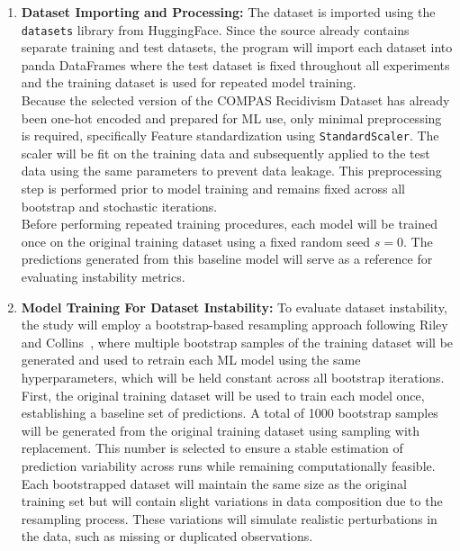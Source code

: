 \documentclass[12pt]{article}
\begin{document}
\begin{enumerate}
  \item \textbf{Dataset Importing and Processing:}
  The dataset is imported using the \texttt{datasets} library from HuggingFace. Since the source already contains separate training and test datasets, the program will import each dataset into panda DataFrames where the test dataset is fixed throughout all experiments and the training dataset is used for repeated model training.\\

  Because the selected version of the COMPAS Recidivism Dataset has already been one-hot encoded and prepared for ML use, only minimal preprocessing is required, specifically Feature standardization using \texttt{StandardScaler}. The scaler will be fit on the training data and subsequently applied to the test data using the same parameters to prevent data leakage. This preprocessing step is performed prior to model training and remains fixed across all bootstrap and stochastic iterations.\\

  Before performing repeated training procedures, each model will be trained once on the original training dataset using a fixed random seed $s = 0$. The predictions generated from this baseline model will serve as a reference for evaluating instability metrics.

  \item \textbf{Model Training For Dataset Instability:}
  To evaluate dataset instability, the study will employ a bootstrap-based resampling approach following Riley and Collins~\cite{riley2023stability}, where multiple bootstrap samples of the training dataset will be generated and used to retrain each ML model using the same hyperparameters, which will be held constant across all bootstrap iterations.\\

  First, the original training dataset will be used to train each model once, establishing a baseline set of predictions. A total of 1000 bootstrap samples will be generated from the original training dataset using sampling with replacement. This number is selected to ensure a stable estimation of prediction variability across runs while remaining computationally feasible. Each bootstrapped dataset will maintain the same size as the original training set but will contain slight variations in data composition due to the resampling process. These variations will simulate realistic perturbations in the data, such as missing or duplicated observations.\\


\end{enumerate}
\end{document}

